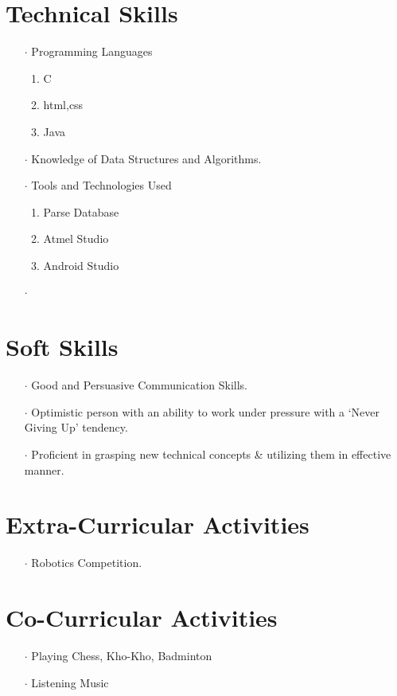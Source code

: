 \documentclass[12pt]{article}
\begin{document}
\section*{Technical Skills}
\begin{itemize}
\item[$\cdot$]Programming Languages
\begin{enumerate}
\item C
\item html,css
\item Java
\end{enumerate}
\item[$\cdot$]Knowledge of Data Structures and Algorithms.
\item[$\cdot$]Tools and Technologies Used
\begin{enumerate}
\item Parse Database
\item Atmel Studio
\item Android Studio
\end{enumerate}
\end{itemize}
\begin{itemize}
\item[$\cdot$]
\end{itemize}
\section*{Soft Skills}
\begin{itemize}
\item[$\cdot$]Good and Persuasive Communication Skills.
\item[$\cdot$]Optimistic person with an ability to work under pressure with a ‘Never Giving Up’ tendency.
\item[$\cdot$]Proficient in grasping new technical concepts \& utilizing them in effective manner.
\end{itemize}
\section*{Extra-Curricular Activities}
\begin{itemize}
\item[$\cdot$]Robotics Competition.
\end{itemize}
\section*{Co-Curricular Activities}
\begin{itemize}
\item[$\cdot$] Playing Chess, Kho-Kho, Badminton
\item[$\cdot$] Listening Music
 \end{itemize}
\end{document}
